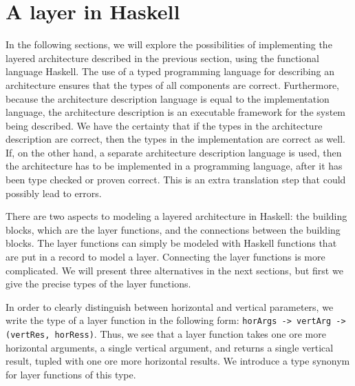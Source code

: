 %																
%																
%																
\section{A layer in Haskell}

In the following sections, we will explore the possibilities of implementing the layered architecture described in the previous section, using the functional language Haskell. The use of a typed programming language for describing an architecture ensures that the types of all components are correct. Furthermore, because the architecture description language is equal to the implementation language, the architecture description is an executable framework for the system being described. We have the certainty that if the types in the architecture description are correct, then the types in the implementation are correct as well. If, on the other hand, a separate architecture description language is used, then the architecture has to be implemented in a programming language, after it has been type checked or proven correct. This is an extra translation step that could possibly lead to errors.

There are two aspects to modeling a layered architecture in Haskell: the building blocks, which are the layer functions, and the connections between the building blocks. The layer functions can simply be modeled with Haskell functions that are put in a record to model a layer. Connecting the layer functions is more complicated. We will present three alternatives in the next sections, but first we give the precise types of the layer functions. 

In order to clearly distinguish between horizontal and vertical parameters, we write the type of a layer function in the following form: \texttt{horArgs -> vertArg -> (vertRes, horRess)}. Thus, we see that a layer function takes one ore more horizontal arguments, a single vertical argument, and returns a single vertical result, tupled with one ore more horizontal results. We introduce a type synonym for layer functions of this type. 



